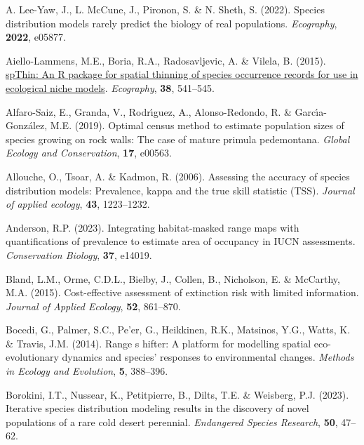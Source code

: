 \documentclass[
]{article}
\newlength{\cslhangindent}
\newenvironment{CSLReferences}[2] %
 {\begin{list}{}{%
  \setlength{\itemindent}{0pt}
  \setlength{\leftmargin}{0pt}
  \setlength{\parsep}{0pt}
  \ifodd #1
   \setlength{\leftmargin}{\cslhangindent}
   \setlength{\itemindent}{-1\cslhangindent}
  \fi
  \setlength{\itemsep}{#2\baselineskip}}}
 {\end{list}}
\begin{document}
\label{refs}
\begin{CSLReferences}{1}{1}
A. Lee-Yaw, J., L. McCune, J., Pironon, S. \& N. Sheth, S. (2022).
Species distribution models rarely predict the biology of real
populations. \emph{Ecography}, \textbf{2022}, e05877.

Aiello-Lammens, M.E., Boria, R.A., Radosavljevic, A. \& Vilela, B.
(2015).
\href{https://onlinelibrary.wiley.com/doi/10.1111/ecog.01132}{{spThin}:
An {R} package for spatial thinning of species occurrence records for
use in ecological niche models}. \emph{Ecography}, \textbf{38},
541--545.

Alfaro-Saiz, E., Granda, V., Rodrı́guez, A., Alonso-Redondo, R. \&
Garcı́a-González, M.E. (2019). Optimal census method to estimate
population sizes of species growing on rock walls: The case of mature
primula pedemontana. \emph{Global Ecology and Conservation},
\textbf{17}, e00563.

Allouche, O., Tsoar, A. \& Kadmon, R. (2006). Assessing the accuracy of
species distribution models: Prevalence, kappa and the true skill
statistic (TSS). \emph{Journal of applied ecology}, \textbf{43},
1223--1232.

Anderson, R.P. (2023). Integrating habitat-masked range maps with
quantifications of prevalence to estimate area of occupancy in IUCN
assessments. \emph{Conservation Biology}, \textbf{37}, e14019.

Bland, L.M., Orme, C.D.L., Bielby, J., Collen, B., Nicholson, E. \&
McCarthy, M.A. (2015). Cost-effective assessment of extinction risk with
limited information. \emph{Journal of Applied Ecology}, \textbf{52},
861--870.

Bocedi, G., Palmer, S.C., Pe'er, G., Heikkinen, R.K., Matsinos, Y.G.,
Watts, K. \& Travis, J.M. (2014). Range s hifter: A platform for
modelling spatial eco-evolutionary dynamics and species' responses to
environmental changes. \emph{Methods in Ecology and Evolution},
\textbf{5}, 388--396.

Borokini, I.T., Nussear, K., Petitpierre, B., Dilts, T.E. \& Weisberg,
P.J. (2023). Iterative species distribution modeling results in the
discovery of novel populations of a rare cold desert perennial.
\emph{Endangered Species Research}, \textbf{50}, 47--62.


\end{CSLReferences}
\end{document}
